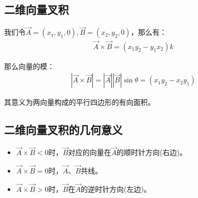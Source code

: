 \subsection{二维向量叉积}
我们令$\overrightarrow{A} = (x_1, y_1, 0), \overrightarrow{B} = (x_2, y_2, 0)$，那么有：
\begin{eqnarray*}
\overrightarrow{A} \times \overrightarrow{B} 
= 
(x_1y_2 - y_1x_2)k
\end{eqnarray*} \par
那么向量的模：
\begin{eqnarray*}
|\overrightarrow{A} \times \overrightarrow{B}| = |\overrightarrow{A}||\overrightarrow{B}|\sin\theta = (x_1y_2 - x_2y_1)
\end{eqnarray*} \par
其意义为两向量构成的平行四边形的有向面积。
\subsection{二维向量叉积的几何意义}
\begin{itemize}
\item $\overrightarrow{A} \times \overrightarrow{B} < 0$时，$\overrightarrow{B}$对应的向量在$\overrightarrow{A}$的顺时针方向(右边)。
\item $\overrightarrow{A} \times \overrightarrow{B} = 0$时，$\overrightarrow{A}$、$\overrightarrow{B}$共线。
\item $\overrightarrow{A} \times \overrightarrow{B} > 0$时，$\overrightarrow{B}$在$\overrightarrow{A}$的逆时针方向(左边)。
\end{itemize}

